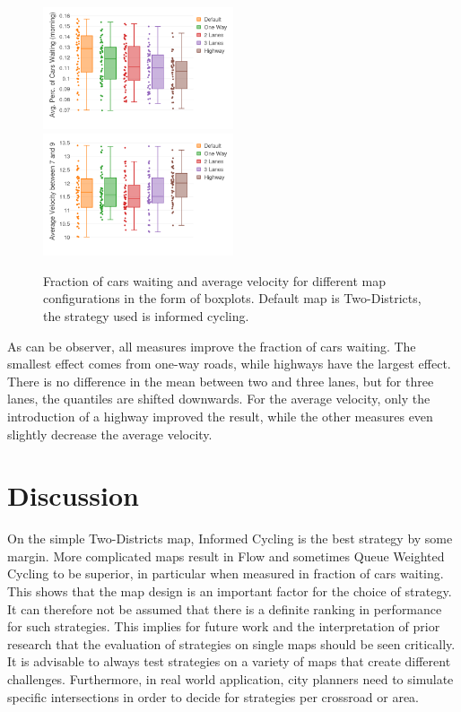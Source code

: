 \documentclass[11pt]{article}
\begin{document}
\begin{figure}[t]
	\includegraphics[width=0.5\textwidth]{img/urban_planning_frac.png}
	\includegraphics[width=0.5\textwidth]{img/urban_planning_velo.png}
	\caption{Fraction of cars waiting and average velocity for different map configurations in the form of boxplots. Default map is Two-Districts, the strategy used is informed cycling. \label{fig:urban-planning-stats}}
\end{figure}

As can be observer, all measures improve the fraction of cars waiting. The smallest effect comes from one-way roads, while highways have the largest effect. There is no difference in the mean between two and three lanes, but for three lanes, the quantiles are shifted downwards. For the average velocity, only the introduction of a highway improved the result, while the other measures even slightly decrease the average velocity.

\section{Discussion}
\label{sec:discussion}
On the simple Two-Districts map, Informed Cycling is the best strategy by some margin. More complicated maps result in Flow and sometimes Queue Weighted Cycling to be superior, in particular when measured in fraction of cars waiting. This shows that the map design is an important factor for the choice of strategy. It can therefore not be assumed that there is a definite ranking in performance for such strategies. This implies for future work and the interpretation of prior research that the evaluation of strategies on single maps should be seen critically. It is advisable to always test strategies on a variety of maps that create different challenges. Furthermore, in real world application, city planners need to simulate specific intersections in order to decide for strategies per crossroad or area.
\end{document}
